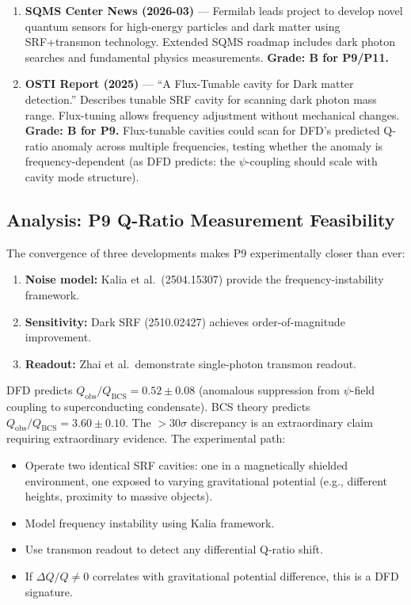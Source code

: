 \documentclass[11pt,a4paper]{article}
\begin{document}
\begin{enumerate}
\item \textbf{SQMS Center News (2026-03)} --- Fermilab leads project to develop novel quantum sensors for high-energy particles and dark matter using SRF+transmon technology. Extended SQMS roadmap includes dark photon searches and fundamental physics measurements. \textbf{Grade: B for P9/P11.}

\item \textbf{OSTI Report (2025)} --- ``A Flux-Tunable cavity for Dark matter detection.'' Describes tunable SRF cavity for scanning dark photon mass range. Flux-tuning allows frequency adjustment without mechanical changes. \textbf{Grade: B for P9.} Flux-tunable cavities could scan for DFD's predicted Q-ratio anomaly across multiple frequencies, testing whether the anomaly is frequency-dependent (as DFD predicts: the $\psi$-coupling should scale with cavity mode structure).

\end{enumerate}

\subsection{Analysis: P9 Q-Ratio Measurement Feasibility}

The convergence of three developments makes P9 experimentally closer than ever:

\begin{enumerate}
\item \textbf{Noise model:} Kalia et al.\ (2504.15307) provide the frequency-instability framework.
\item \textbf{Sensitivity:} Dark SRF (2510.02427) achieves order-of-magnitude improvement.
\item \textbf{Readout:} Zhai et al.\ demonstrate single-photon transmon readout.
\end{enumerate}

DFD predicts $Q_\mathrm{obs}/Q_\mathrm{BCS} = 0.52 \pm 0.08$ (anomalous suppression from $\psi$-field coupling to superconducting condensate). BCS theory predicts $Q_\mathrm{obs}/Q_\mathrm{BCS} = 3.60 \pm 0.10$. The $>$30$\sigma$ discrepancy is an extraordinary claim requiring extraordinary evidence. The experimental path:

\begin{itemize}
\item Operate two identical SRF cavities: one in a magnetically shielded environment, one exposed to varying gravitational potential (e.g., different heights, proximity to massive objects).
\item Model frequency instability using Kalia framework.
\item Use transmon readout to detect any differential Q-ratio shift.
\item If $\Delta Q/Q \neq 0$ correlates with gravitational potential difference, this is a DFD signature.
\end{itemize}
\end{document}
